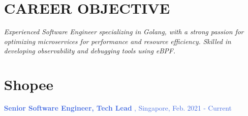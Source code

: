 \documentclass[margin]{res}
\begin{document}
\begin{resume}

{\color{royalblue} \section{CAREER OBJECTIVE}}
{\sl
Experienced Software Engineer specializing in Golang, with a strong passion for optimizing microservices for performance and resource efficiency. Skilled in developing observability and debugging tools using eBPF. 
}

{\color{royalblue} \section{Shopee}}
\textcolor{royalblue}
{\textbf{Senior Software Engineer, Tech Lead }, Singapore, Feb. 2021 - Current}\\
\\
\normalfont{\textbullet{} \textbf{\textcolor {royalblue} {Design and Lead Profiling Solution for Performance Optimization}}\\
}
\end{resume}
\end{document}

